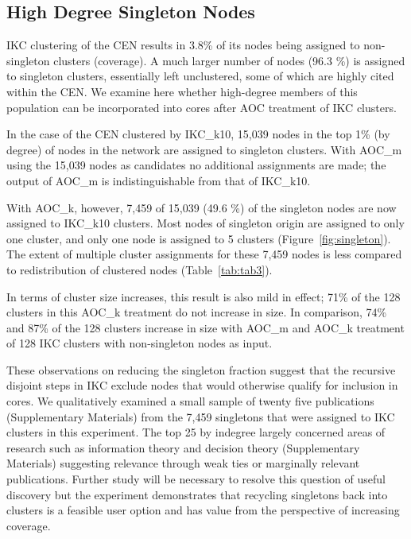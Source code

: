 \documentclass[12pt, oneside]{article}   	%
\begin{document}
\subsection{High Degree Singleton Nodes} 
 
IKC clustering of the CEN results in 3.8\% of its nodes being assigned to non-singleton clusters (coverage). A much larger number of nodes (96.3 \%) is assigned to singleton clusters, essentially left unclustered, some of which are highly cited within the CEN. We examine here whether high-degree members of this population can be incorporated into cores after AOC treatment of IKC clusters. 

In the case of the CEN clustered by IKC\_k10, 15,039 nodes in the top 1\% (by degree) of nodes in the network are assigned to singleton clusters.  With AOC\_m using the 15,039 nodes as candidates no additional assignments are made; the output of AOC\_m is indistinguishable from that of IKC\_k10. 

With AOC\_k, however, 7,459 of 15,039 (49.6 \%) of the singleton nodes are now assigned to IKC\_k10 clusters. Most nodes of singleton origin are assigned to only one cluster, and only one node is assigned to 5 clusters (Figure~\ref{fig:singleton}). The extent of multiple cluster assignments for these 7,459 nodes is less compared to redistribution of clustered nodes (Table~\ref{tab:tab3}). 

In terms of cluster size increases, this result is also mild in effect; 71\% of the 128 clusters in this AOC\_k treatment do not increase in size. In comparison, 74\% and 87\% of the 128 clusters increase in size with AOC\_m and AOC\_k treatment of 128 IKC clusters with non-singleton nodes as input. 

These observations on reducing the singleton fraction suggest that the recursive disjoint steps in IKC exclude nodes that would otherwise qualify for inclusion in cores. We qualitatively examined a small sample of twenty five publications (Supplementary Materials) from the 7,459 singletons that were assigned to IKC clusters in this experiment. The top 25 by indegree largely concerned areas of research such as information theory and decision theory (Supplementary Materials) suggesting relevance through weak ties \citep{granovetter1973strength} or marginally relevant publications. Further study will be necessary to resolve this question of useful discovery but the experiment demonstrates that recycling singletons back into clusters is a feasible user option and has value from the perspective of increasing coverage. 
\end{document}
